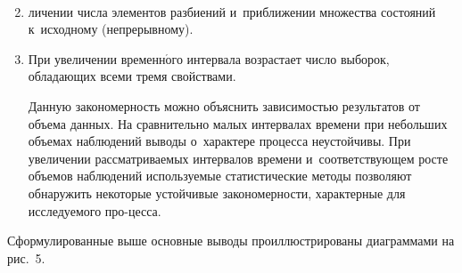 \begin{figure*} %
  \vspace*{1pt}
  \begin{center}  
    \mbox{%
\epsfxsize=162.869mm
}

\end{center}
\vspace*{-13pt}
   \end{figure*}
   
   \begin{multicols}{2}


\begin{enumerate}[1.]
\setcounter{enumi}{1}
\item[\,]
  личении чис\-ла элементов разбиений и~при\-бли\-же\-нии 
множества со\-сто\-яний к~исходному (непрерывному).
\item При увеличении временн$\acute{\mbox{о}}$го интервала воз\-рас\-та\-ет 
число выборок, об\-ла\-да\-ющих всеми тремя свойствами.

  
  Данную закономерность можно объяснить зависимостью результатов от 
объема данных. На сравнительно малых интервалах времени при\linebreak 
небольших объемах наблюдений выводы о~характере процесса неустойчивы. 
При увеличении рас\-смат\-ри\-ва\-емых интервалов времени и~соответствующем 
рос\-те объемов наблюдений ис\-поль\-зу\-емые статистические методы позволяют 
обнаружить некоторые устойчивые закономерности, характерные для 
ис\-сле\-ду\-емо\-го про-\linebreak цесса.
\end{enumerate}
  
  Сформулированные выше основные выводы проиллюстрированы 
диаграммами на рис.~5.

\begin{figure*} %
\vspace*{1pt}
  \begin{center}  
    \mbox{%
\epsfxsize=157.357mm
}

\end{center}
\vspace*{-9pt}
\end{figure*}


\end{multicols}

